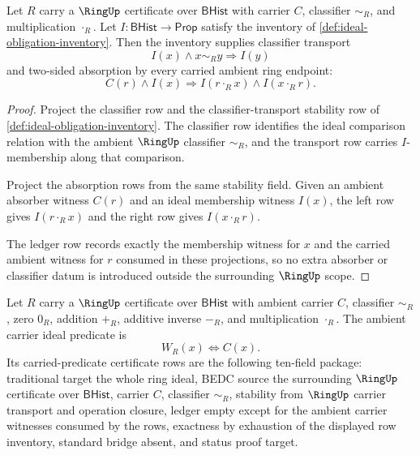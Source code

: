 \begin{theorem}
\label{thm:ideal-classifier-absorption-obligation}
Let $R$ carry a $\RingUp$ certificate over $\mathsf{BHist}$ with carrier $C$,
classifier $\sim_R$, and multiplication $\cdot_R$. Let
$I:\mathsf{BHist}\to\mathsf{Prop}$ satisfy the inventory of
\autoref{def:ideal-obligation-inventory}. Then the inventory supplies
classifier transport
$$
I(x)\land x\sim_R y\Longrightarrow I(y)
$$
and two-sided absorption by every carried ambient ring endpoint:
$$
C(r)\land I(x)\Longrightarrow I(r\cdot_R x)\land I(x\cdot_R r).
$$
\end{theorem}
\begin{proof}
Project the classifier row and the classifier-transport stability row of
\autoref{def:ideal-obligation-inventory}. The classifier row identifies the
ideal comparison relation with the ambient $\RingUp$ classifier $\sim_R$, and
the transport row carries $I$-membership along that comparison.

Project the absorption rows from the same stability field. Given an ambient
absorber witness $C(r)$ and an ideal membership witness $I(x)$, the left row
gives $I(r\cdot_R x)$ and the right row gives $I(x\cdot_R r)$.

The ledger row records exactly the membership witness for $x$ and the carried
ambient witness for $r$ consumed in these projections, so no extra absorber or
classifier datum is introduced outside the surrounding $\RingUp$ scope.
\end{proof}

\begin{definition}
\label{def:ideal-ambient-carrier-predicate}
Let $R$ carry a $\RingUp$ certificate over $\mathsf{BHist}$ with ambient carrier
$C$, classifier $\sim_R$, zero $0_R$, addition $+_R$, additive inverse $-_R$,
and multiplication $\cdot_R$. The ambient carrier ideal predicate is
$$
W_R(x)\Longleftrightarrow C(x).
$$
Its carried-predicate certificate rows are the following ten-field package:
traditional target the whole ring ideal, BEDC source the surrounding $\RingUp$
certificate over $\mathsf{BHist}$, carrier $C$, classifier $\sim_R$, stability
from $\RingUp$ carrier transport and operation closure, ledger empty except for
the ambient carrier witnesses consumed by the rows, exactness by exhaustion of
the displayed row inventory, standard bridge absent, and status proof target.
\end{definition}

